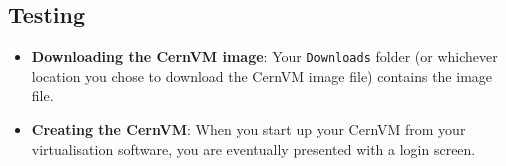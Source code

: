 \subsection{Testing}
\label{creating-a-grid-ui-with-a-gridpp-cernvm---testing}

\begin{itemize}
\item
  \textbf{Downloading the CernVM image}: Your \texttt{Downloads} folder
  (or whichever location you chose to download the CernVM image file)
  contains the image file.

\begin{Shaded}
\begin{Highlighting}[]
\NormalTok{$ } 
\NormalTok{$ } \KeywordTok{|}  
\end{Highlighting}
\end{Shaded}
\item
  \textbf{Creating the CernVM}: When you start up your CernVM from your
  virtualisation software, you are eventually presented with a login
  screen.
\end{itemize}

\begin{Shaded}
\begin{Highlighting}[]
 
   
   

 
 

 
\end{Highlighting}
\end{Shaded}

